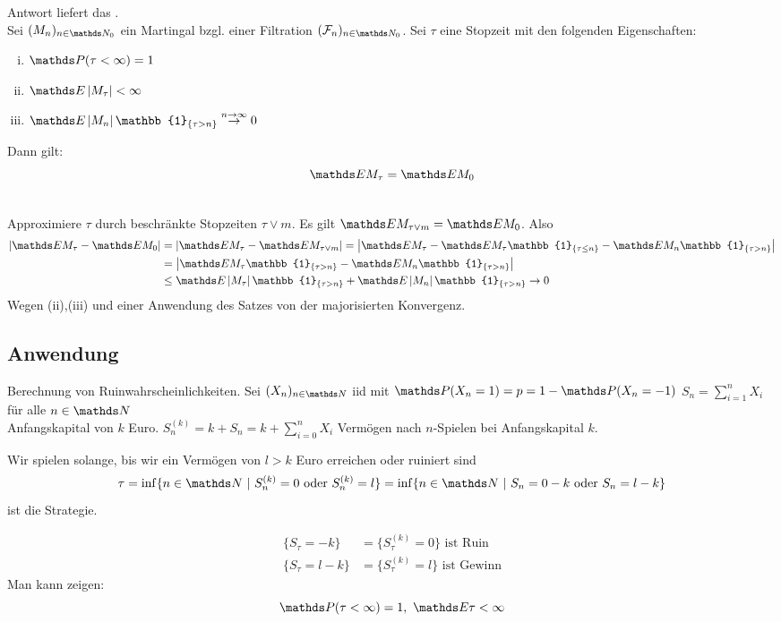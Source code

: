 Antwort liefert das .\\
Sei $(M_n)_{n\in \N_0}$ ein Martingal bzgl. einer Filtration $(\F_n)_{n\in \N_0}$. Sei $\tau$ eine Stopzeit mit den folgenden Eigenschaften:
\begin{enumerate}[(i)]
	\item $\Pw(\tau<\infty)=1$
	\item $\E\abs{M_\tau}<\infty$
	\item $\E\abs{M_n}\mathbb{1}_{\{\tau>n\}} \stackrel{n\to\infty}{\to}0$
\end{enumerate}
Dann gilt: 
\[
\E M_\tau=\E M_0 
\]

\\
Approximiere $\tau$ durch beschränkte Stopzeiten $\tau\lor m$. Es gilt $\E M_{\tau\lor m} =\E M_0$. Also 
\begin{equation*}
\begin{aligned}
	\abs{\E M_\tau-\E M_0}&=\abs{\E M_\tau-\E M_{\tau\lor m}} =\abs{\E M_\tau-\E M_\tau\mathbb{1}_{\{\tau\le n\}}-\E M_n\mathbb{1}_{\{\tau> n\}}}\\
	&= \abs{\E M_\tau\mathbb{1}_{\{\tau> n\}}- \E M_n\mathbb{1}_{\{\tau >n\}}}\\
	&\le \E\abs{M_\tau}\mathbb{1}_{\{\tau> n\}}+ \E\abs{M_n}\mathbb{1}_{\{\tau>n\}} \to 0
\end{aligned}
\end{equation*}
Wegen (ii),(iii) und einer Anwendung des Satzes von der majorisierten Konvergenz.



\subsection{Anwendung}

Berechnung von Ruinwahrscheinlichkeiten. Sei $(X_n)_{n\in \N}$ iid mit $\Pw(X_n=1)=p=1-\Pw(X_n=-1)$ $S_n=\sum_{i=1}^{n} X_i$ für alle $n\in \N$\\
Anfangskapital von $k$ Euro. $S_n^{(k)}=k+S_n=k+\sum_{i=0}^{n} X_i$ Vermögen nach $n$-Spielen bei Anfangskapital $k$.

Wir spielen solange, bis wir ein Vermögen von $l>k$ Euro erreichen oder ruiniert sind 
\[
\tau=\inf\{n\in \N~|~S_n^{(k)}=0\text{ oder } S_n^{(k)}=l \} = \inf\{n\in \N~|~S_n=0-k\text{ oder } S_n=l-k \}
\]
ist die Strategie.

\begin{equation*}
\begin{aligned}
	\{S_\tau=-k\} &= \{S_\tau^{(k)}=0\} \text{ ist Ruin}\\
	\{S_\tau=l-k\} &= \{S_\tau^{(k)}=l\} \text{ ist Gewinn}
\end{aligned}
\end{equation*}
Man kann zeigen: 
\[
\Pw(\tau<\infty)=1,~\E \tau<\infty 
\]

